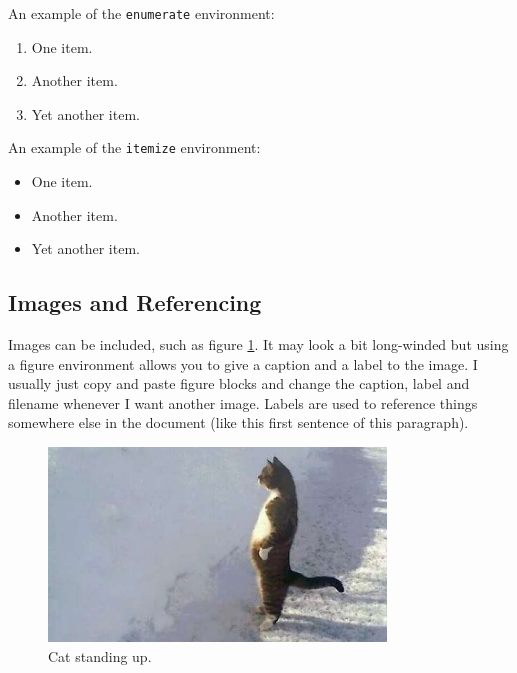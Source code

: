 \documentclass[12pt]{article}
\begin{document}
An example of the \texttt{enumerate} environment:
\begin{enumerate}
	\item One item.
	\item Another item.
	\item Yet another item.
\end{enumerate}

An example of the \texttt{itemize} environment:
\begin{itemize}
	\item One item.
	\item Another item.
	\item Yet another item.
\end{itemize}

\subsection{Images and Referencing}

Images can be included, such as figure \ref{fig:cat}. It may look a bit long-winded but using a figure environment allows you to give a caption and a label to the image. I usually just copy and paste figure blocks and change the caption, label and filename whenever I want another image. Labels are used to reference things somewhere else in the document (like this first sentence of this paragraph).

\begin{figure}[H]	%
	\centering 		%
	\includegraphics[width=0.8\textwidth]{cat}	%
	\caption{Cat standing up.}	%
	\label{fig:cat}	%
\end{figure}
\end{document}
